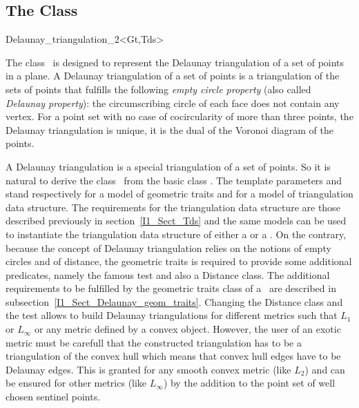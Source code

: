 \subsection{The Class \protect {}}
\begin{ccClassTemplate} {Delaunay_triangulation_2<Gt,Tds>}
\ccDefinition

The class \ccClassTemplateName\ is designed to represent
the Delaunay triangulation of a set of points in a plane.
A  Delaunay triangulation of a set of points
is a triangulation of the sets of points that fulfills
the following {\em empty circle property} 
(also called {\em Delaunay property}): the circumscribing
circle of each
 face does not contain any vertex.
For a point set with no case of cocircularity 
of more than three points,
the Delaunay triangulation is unique, it is  the dual
of the Voronoi diagram of the points.


A Delaunay triangulation is a special triangulation of a set of points.
So it is natural to derive  the class \ccClassTemplateName\
from the basic class .
The template parameters  and  stand 
respectively
for a model of geometric traits and for a model of triangulation data structure.
The requirements for the triangulation data structure
are those described previously in section~\ref{I1_Sect_Tds}
and the same models can be used to instantiate the
triangulation data structure of either a 
or a \ccClassTemplateName. On the contrary, because the
concept of Delaunay triangulation relies on the notions of 
empty circles and of distance, 
the geometric traits is required to provide some additional predicates,
namely the famous \ccc{in_circle} test and also
a Distance class. The additional requirements
to be fulfilled by the geometric traits class
of a \ccClassTemplateName\ are described in 
subsection~\ref{I1_Sect_Delaunay_geom_traits}. 
Changing the Distance class and the  test
allows to build Delaunay triangulations for different metrics
such that $L_1$ or $L_{\infty}$ or any metric defined by a
convex object. However, the user of an exotic metric
must be carefull that the constructed triangulation 
has to be a triangulation of the convex hull
which means that convex hull edges have to be Delaunay edges.
This is granted for any smooth convex metric (like $L_2$)
and can be ensured for other metrics (like  $L_{\infty}$)
by the addition to the point set of well chosen sentinel points.




\end{ccClassTemplate}
